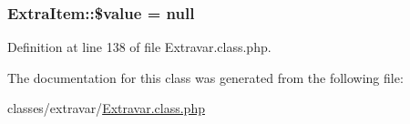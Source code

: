 \subsubsection[{\$value}]{\setlength{\rightskip}{0pt plus 5cm}Extra\+Item\+::\$value = null}\label{classExtraItem_a46622b49026acdfce833d5118a43986d}


Definition at line 138 of file Extravar.\+class.\+php.



The documentation for this class was generated from the following file\+:\begin{DoxyCompactItemize}
\item 
classes/extravar/\hyperlink{Extravar_8class_8php}{Extravar.\+class.\+php}\end{DoxyCompactItemize}
